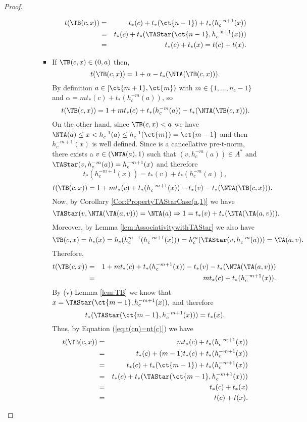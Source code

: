 \begin{proof}
\begin{enumerate}[label=(\roman*)]
\begin{itemize}
\begin{itemize}
\begin{itemize}
\begin{eqnarray*}
						t(\TB(c,x)) &=&  t_*(c) + t_*(\ct{n-1}) + t_*(h_c^{-n+1}(x)) \\
						& = & t_*(c) + t_*(\TAStar(\ct{n-1},h_c^{-n+1}(x))) \\
						& = & t_*(c) + t_*(x) = t(c)+t(x).
					\end{eqnarray*}
					\item If $\TB(c,x) \in (0,a)$ then,
					$$t(\TB(c,x)) = 1+ \alpha - t_*(\NTA(\TB(c,x))).$$
					By definition $a \in [\ct{m+1},\ct{m})$ with $ m \in \{1,\dots,n_c-1\}$ and $\alpha = mt_*(c)+t_*(h_c^{-m}(a))$, so
					$$t(\TB(c,x)) = 1 + mt_*(c)+t_*(h_c^{-m}(a)) - t_*(\NTA(\TB(c,x))).$$
					On the other hand, since $\TB(c,x) < a$ we have $\NTA(a) \leq x < h_c^{-1}(a) \leq h_c^{-1}(\ct{m}) = \ct{m-1}$ and then $h_c^{-m+1}(x)$ is well defined. Since \TAStar is a cancellative pre-t-norm, there exists a $v \in (\NTA(a),1)$ such that $(v,h_c^{-m}(a)) \in A^*$ and $\TAStar(v,h_c^{-m}(a)) = h_c^{-m+1}(x)$ and therefore
					$$ t_*(h_c^{-m+1}(x)) = t_*(v)+t_*(h_c^{-m}(a)),$$
					$$t(\TB(c,x)) = 1 + mt_*(c)+t_*(h_c^{-m+1}(x))- t_*(v) - t_*(\NTA(\TB(c,x))).$$
					Now, by Corollary \ref{Cor:PropertyTAStarCase(a,1)} we have
					$$\TAStar(v,\NTA(\TA(a,v))) = \NTA(a) \Rightarrow 1 = t_*(v)+ t_*(\NTA(\TA(a,v))).$$
					Moreover, by Lemma \ref{lem:AssociativitywithTAStar} we also have
					$$\TB(c,x)=h_c(x)= h_c(h_c^{m-1}(h_c^{-m+1}(x))) = h_c^m(\TAStar(v,h_c^{-m}(a))) = \TA(a,v).$$
					Therefore,
					\begin{eqnarray*}
						t(\TB(c,x)) &=& 1 + mt_*(c)+t_*(h_c^{-m+1}(x))- t_*(v) - t_*(\NTA(\TA(a,v))) \\
						&=& mt_*(c)+t_*(h_c^{-m+1}(x)).
					\end{eqnarray*}
					By (v)-Lemma \ref{lem:TB} we know that $x= \TAStar(\ct{m-1},h_c^{-m+1}(x)),$ and therefore
					$$t_*(\TAStar(\ct{m-1},h_c^{-m+1}(x))) = t_*(x).$$
					Thus, by Equation (\ref{eq:t(cn)=nt(c)}) we have
					\begin{eqnarray*}
						t(\TB(c,x)) &=& mt_*(c)+t_*(h_c^{-m+1}(x)) \\
						&=&  t_*(c) + (m-1)t_*(c)+t_*(h_c^{-m+1}(x)) \\
						&=&  t_*(c) + t_*(\ct{m-1})+t_*(h_c^{-m+1}(x)) \\
						&=&t_*(c)+t_*(\TAStar(\ct{m-1},h_c^{-m+1}(x)))\\
						&=& t_*(c)+t_*(x)\\
						&=& t(c)+t(x).
					\end{eqnarray*}
				\end{itemize}

\end{itemize}
\end{itemize}
\end{enumerate}
\end{proof}
